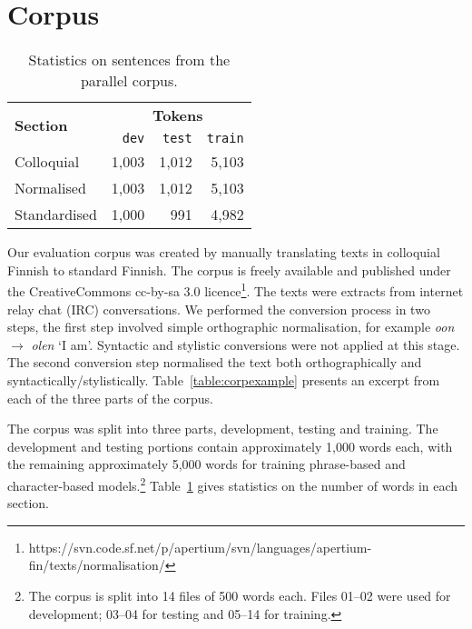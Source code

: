 \documentclass[11pt]{article}
\begin{document}
\section{Corpus}

\begin{table}
  \centering
 \begin{tabular}{|l|r|r|r|}
    \hline
    \multirow{2}{*}{\textbf{Section}} & \multicolumn{3}{|c|}{\textbf{Tokens}} \\\cline{2-4}
                                      & \texttt{dev} & \texttt{test} & \texttt{train} \\
    \hline
    Colloquial                           & 1,003 & 1,012 & 5,103 \\ 
    Normalised                           & 1,003 & 1,012 & 5,103 \\ 
    Standardised                         & 1,000 & 991 & 4,982 \\
    \hline
 \end{tabular} 
  \caption{Statistics on sentences from the parallel corpus.}
  \label{table:corpsize}
\end{table}


Our evaluation corpus was created by manually translating texts in colloquial Finnish
to standard Finnish. The corpus is freely available and published under the 
CreativeCommons {\sc cc-by-sa} 3.0 licence\footnote{https://svn.code.sf.net/p/apertium/svn/languages/apertium-fin/texts/normalisation/}.
The texts were extracts from internet 
relay chat (IRC) conversations. We performed the conversion process in two steps, the first
step involved simple orthographic normalisation, for 
example \emph{oon} $\rightarrow$ \emph{olen} `I am'. Syntactic and stylistic conversions 
were not applied at this stage. The second conversion step normalised the text
both orthographically and syntactically/stylistically. Table~\ref{table:corpexample} presents
an excerpt from each of the three parts of the corpus.

The corpus was split into three parts, development, testing and training. The development and testing portions contain approximately 1,000 words each, with the remaining approximately 5,000 words for training
phrase-based and character-based models.\footnote{The corpus is split into 14 files of 500 words each. Files 01--02 
  were used for development; 03--04 for testing and 05--14 for training.} Table~\ref{table:corpsize} gives statistics on the number of words in each section.
\end{document}

